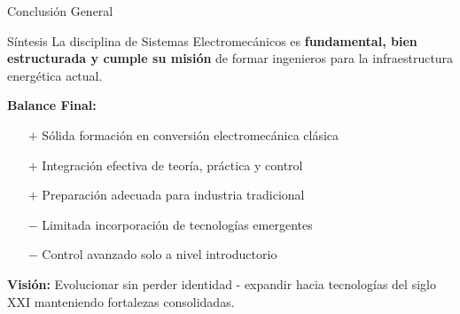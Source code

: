 \documentclass[aspectratio=43]{beamer}
\begin{document}
  \begin{frame}{Conclusión General}
  \begin{alertblock}{Síntesis}
  La disciplina de Sistemas Electromecánicos es \textbf{fundamental, bien estructurada y cumple su misión} de formar ingenieros para la infraestructura energética actual.
  \end{alertblock}
  
  \pause

  \vspace{-0.2cm}

  \textbf{Balance Final:}
  \begin{itemize}
  \item[$+$] Sólida formación en conversión electromecánica clásica
  \item[$+$] Integración efectiva de teoría, práctica y control
  \item[$+$] Preparación adecuada para industria tradicional
  \item[$-$] Limitada incorporación de tecnologías emergentes
  \item[$-$] Control avanzado solo a nivel introductorio
  \end{itemize}
  
  
  \textbf{Visión:} Evolucionar sin perder identidad - expandir hacia tecnologías del siglo XXI manteniendo fortalezas consolidadas.
  
  \end{frame}
  
\end{document}
